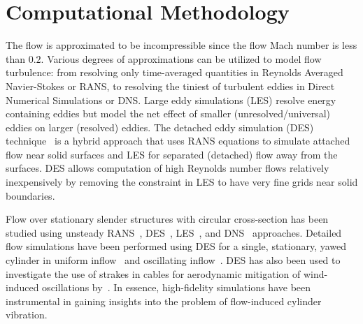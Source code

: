 \section{Computational Methodology}
\label{sec:methodology}
%
The flow is approximated to be incompressible since the flow Mach number is
less than $0.2$. Various degrees of approximations can be utilized to model
flow turbulence: from resolving only time-averaged quantities in Reynolds
Averaged Navier-Stokes or RANS, to resolving the tiniest of turbulent eddies in
Direct Numerical Simulations or DNS. Large eddy simulations (LES) resolve
energy containing eddies but model the net effect of smaller
(unresolved/universal) eddies on larger (resolved) eddies. The detached eddy
simulation (DES) technique~\citep{spalart1997comments} is a hybrid approach
that uses RANS equations to simulate attached flow near solid surfaces and LES
for separated (detached) flow away from the surfaces. DES allows computation of
high Reynolds number flows relatively inexpensively by removing the constraint
in LES to have very fine grids near solid boundaries.

Flow over stationary slender structures with circular cross-section has been
studied using unsteady RANS~\citep{pontaza2009three},
DES~\citep{travin2000detached,yeo2011computational,yeo2012aerodynamic},
LES~\citep{breuer1998large,kravchenko2000numerical,catalano2003numerical}, and
DNS~\citep{dong2005dns,zhao2009direct} approaches. Detailed flow simulations
have been performed using DES for a single, stationary, yawed cylinder in
uniform inflow~\citep{yeo2007characteristics,yeo2008investigation} and
oscillating inflow~\citep{yeo2012aerodynamic}.  DES has also been used to
investigate the use of strakes in cables for aerodynamic mitigation of
wind-induced oscillations by~\cite{yeo2011computational}. In essence,
high-fidelity simulations have been instrumental in gaining insights into the
problem of flow-induced cylinder vibration.

